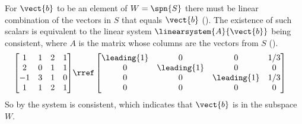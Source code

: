 For $\vect{b}$ to be an element of $W=\spn{S}$ there must be linear combination of the vectors in $S$ that equals $\vect{b}$ ().  The existence of such scalars is equivalent to the linear system $\linearsystem{A}{\vect{b}}$ being consistent, where $A$ is the matrix whose columns are the vectors from $S$ ().
%
\begin{align*}
\begin{bmatrix} 
1 & 1 & 2 & 1\\
2 & 0 & 1 & 1\\
-1 & 3 & 1 & 0\\
1 & 1 & 2 & 1
\end{bmatrix} 
&\rref
\begin{bmatrix} 
\leading{1} & 0 & 0 & 1/3\\ 
0 & \leading{1} & 0 & 0 \\ 
0 & 0 & \leading{1} & 1/3 \\
0 & 0 & 0& 0
\end{bmatrix}
\end{align*}
%
So by  the system is consistent, which indicates that $\vect{b}$ is in the subspace $W$.